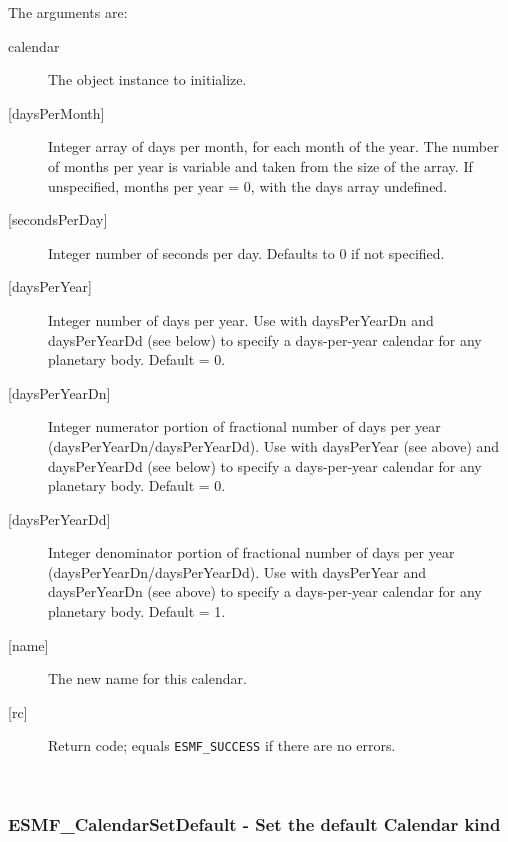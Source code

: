        The arguments are:
       \begin{description}
       \item[calendar]
            The object instance to initialize.
       \item[{[daysPerMonth]}]
            Integer array of days per month, for each month of the year.
            The number of months per year is variable and taken from the
            size of the array.  If unspecified, months per year = 0,
            with the days array undefined.
       \item[{[secondsPerDay]}]
            Integer number of seconds per day.  Defaults to 0 if not 
            specified.
       \item[{[daysPerYear]}]
            Integer number of days per year.  Use with daysPerYearDn and
            daysPerYearDd (see below) to specify a days-per-year calendar
            for any planetary body.  Default = 0.
       \item[{[daysPerYearDn]}]
            Integer numerator portion of fractional number of days per year
            (daysPerYearDn/daysPerYearDd).
            Use with daysPerYear (see above) and daysPerYearDd (see below) to
            specify a days-per-year calendar for any planetary body.
            Default = 0.
       \item[{[daysPerYearDd]}]
            \begin{sloppypar}
            Integer denominator portion of fractional number of days per year
            (daysPerYearDn/daysPerYearDd).
            Use with daysPerYear and daysPerYearDn (see above) to
            specify a days-per-year calendar for any planetary body.
            Default = 1.
            \end{sloppypar}
       \item[{[name]}]
            The new name for this calendar.
       \item[{[rc]}]
            Return code; equals {\tt ESMF\_SUCCESS} if there are no errors.
       \end{description}
        
 
\mbox{}\hrulefill\ 
 
\subsubsection [ESMF\_CalendarSetDefault] {ESMF\_CalendarSetDefault - Set the default Calendar kind}


